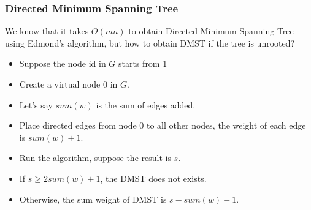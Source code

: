 \documentclass[10pt]{article}{\twocolumn}
\begin{document}
\subsubsection{Directed Minimum Spanning Tree}
We know that it takes $O(mn)$ to obtain Directed Minimum Spanning Tree using Edmond's algorithm, but 
how to obtain DMST if the tree is unrooted?
\begin{itemize}
    \item Suppose the node id in $G$ starts from 1
    \item Create a virtual node 0 in $G$.
    \item Let's say $sum(w)$ is the sum of edges added.
    \item Place directed edges from node 0 to all other nodes, the weight of each edge is $sum(w)+1$.
    \item Run the algorithm, suppose the result is $s$.
    \item If $s\ge{2sum(w)+1}$, the DMST does not exists.
    \item Otherwise, the sum weight of DMST is $s-sum(w)-1$.
\end{itemize}
\end{document}
